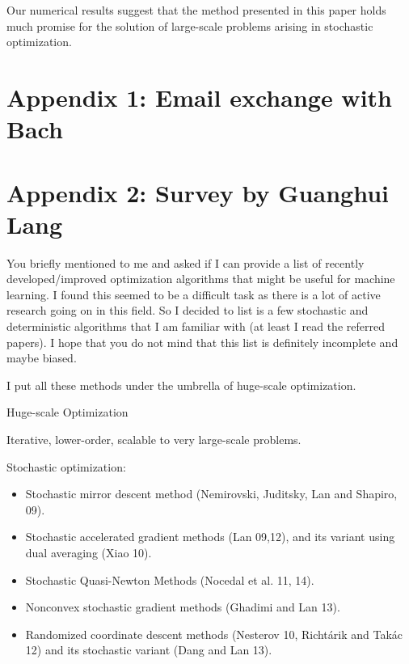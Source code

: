 \documentclass[12pt]{article}
\begin{document}
Our numerical results suggest that the method presented in this paper holds much promise for the solution of large-scale problems arising in stochastic optimization.

\section{Appendix 1: Email exchange with Bach}   \label{bach}


 
 
\section{Appendix 2: Survey by Guanghui Lang}   \label{bach}

You briefly mentioned to me and asked if I can provide a list of recently developed/improved optimization algorithms that might be useful for machine learning. I found this seemed to be a difficult task as there is a lot of active research going on in this field. So I decided to list is a few stochastic and deterministic algorithms that I am familiar with (at least I read the referred papers). I hope that you do not mind that this list is definitely incomplete and maybe biased.

I put all these methods under the umbrella of huge-scale optimization.

\centerline{\large Huge-scale Optimization}

Iterative, lower-order, scalable to very large-scale problems.

\bigskip

Stochastic optimization:
\begin{itemize}
\item Stochastic mirror descent method (Nemirovski, Juditsky, Lan and Shapiro, 09).
\item Stochastic accelerated gradient methods (Lan 09,12), and its variant using dual averaging (Xiao 10).
\item Stochastic Quasi-Newton Methods (Nocedal et al. 11, 14).
\item Nonconvex stochastic gradient methods (Ghadimi and Lan 13).
\item Randomized coordinate descent methods (Nesterov 10, Richt\'{a}rik and Tak\'{a}c 12) and its stochastic
variant (Dang and Lan 13).
\end{itemize}
\end{document}
